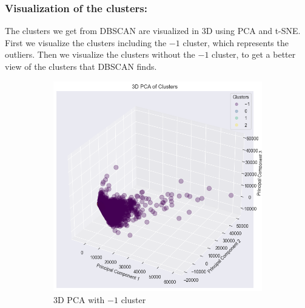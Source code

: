 \subsubsection{Visualization of the clusters:}

The clusters we get from DBSCAN are visualized in 3D using PCA and t-SNE. First we visualize the clusters including the $-1$ cluster, which represents the outliers. Then we visualize the clusters without the $-1$ cluster, to get a better view of the clusters that DBSCAN finds.

\begin{figure}[H]
    \hspace*{\fill}
    \centering
    \begin{subfigure}[b]{0.45\textwidth}
        \centering
        \includegraphics[width=1.0\textwidth]{src/figs/3d_PCA_DBSCAN_with.png} 
        \caption{3D PCA with $-1$ cluster}\label{fig:DBSCAN_PCA_with}
    \end{subfigure}
    \hfill
    \begin{subfigure}[b]{0.45\textwidth}
        \centering

\end{subfigure}
\end{figure}
